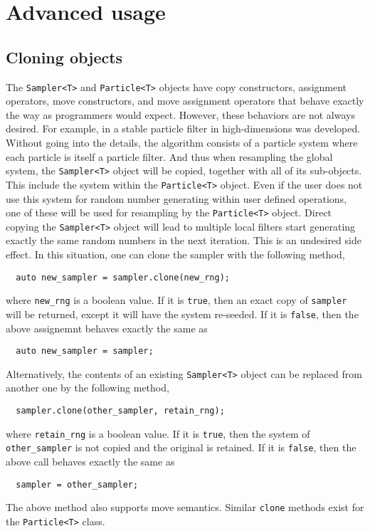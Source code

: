 \chapter{Advanced usage}
\label{chap:Advanced usage}

\section{Cloning objects}
\label{sec:Cloning objects}

The \verb|Sampler<T>| and \verb|Particle<T>| objects have copy constructors,
assignment operators, move constructors, and move assignment operators that
behave exactly the way as \cpp programmers would expect. However, these
behaviors are not always desired. For example, in \textcite{stpf} a stable
particle filter in high-dimensions was developed. Without going into the
details, the algorithm consists of a particle system where each particle is
itself a particle filter. And thus when resampling the global system, the
\verb|Sampler<T>| object will be copied, together with all of its sub-objects.
This include the \rng system within the \verb|Particle<T>| object. Even if the
user does not use this \rng system for random number generating within user
defined operations, one of these \rng will be used for resampling by the
\verb|Particle<T>| object. Direct copying the \verb|Sampler<T>| object will
lead to multiple local filters start generating exactly the same random numbers
in the next iteration. This is an undesired side effect. In this situation, one
can clone the sampler with the following method,
\begin{Verbatim}
  auto new_sampler = sampler.clone(new_rng);
\end{Verbatim}
where \verb|new_rng| is a boolean value. If it is \verb|true|, then an exact
copy of \verb|sampler| will be returned, except it will have the \rng system
re-seeded. If it is \verb|false|, then the above assignemnt behaves exactly the
same as
\begin{Verbatim}
  auto new_sampler = sampler;
\end{Verbatim}
Alternatively, the contents of an existing \verb|Sampler<T>| object can be
replaced from another one by the following method,
\begin{Verbatim}
  sampler.clone(other_sampler, retain_rng);
\end{Verbatim}
where \verb|retain_rng| is a boolean value. If it is \verb|true|, then the \rng
system of \verb|other_sampler| is not copied and the original is retained. If
it is \verb|false|, then the above call behaves exactly the same as
\begin{Verbatim}
  sampler = other_sampler;
\end{Verbatim}
The above method also supports move semantics. Similar \verb|clone| methods
exist for the \verb|Particle<T>| class.

